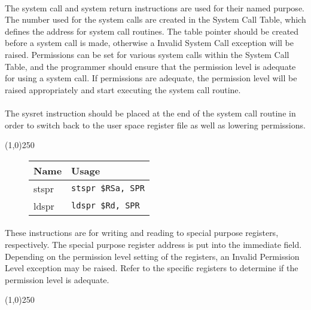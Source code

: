 \documentclass[letterpaper, 11pt]{article}
\begin{document}
\paragraph{} The system call and system return instructions are used for their named purpose. The number used for the system calls are created
in the System Call Table, which defines the address for system call routines. The table pointer should be created before a system call is made,
otherwise a Invalid System Call exception will be raised. Permissions can be set for various system calls within the System Call Table, and the
programmer should ensure that the permission level is adequate for using a system call. If permissions are adequate, the permission level will
be raised appropriately and start executing the system call routine.
\paragraph{}The sysret instruction should be placed at the end of the system call routine in order to switch back
to the user space register file as well as lowering permissions.

\begin{center}
	\line(1,0){250}
\end{center}


\begin{figure}[!h]
	\begin{center}
		\begin{tabular}{|l|l|}
			\hline
			Name		& Usage \\ \hline
			stspr		& \texttt{stspr \$RSa, SPR}	\\ \hline
			ldspr		& \texttt{ldspr \$Rd, SPR}	\\ \hline
		 		\end{tabular} 
	\end{center}
	
\end{figure}
\paragraph{} These instructions are for writing and reading to special purpose registers, respectively. The special purpose register address is put
into the immediate field. Depending on the permission level setting of the registers, an Invalid Permission Level exception may be raised.
Refer to the specific registers to determine if the permission level is adequate.

\begin{center}
	\line(1,0){250}
\end{center}
\end{document}
